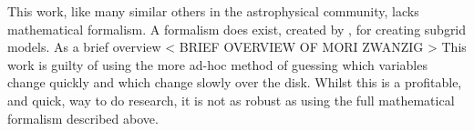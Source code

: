 This work, like many similar others in the astrophysical community, lacks mathematical formalism.
A formalism does exist, created by \citet{moriz_zwanzig}, for creating subgrid models.
As a brief overview
< BRIEF OVERVIEW OF MORI ZWANZIG >
This work is guilty of using the more ad-hoc method of guessing which variables change quickly and which change slowly over the disk.
Whilst this is a profitable, and quick, way to do research, it is not as robust as using the full mathematical formalism described above.
